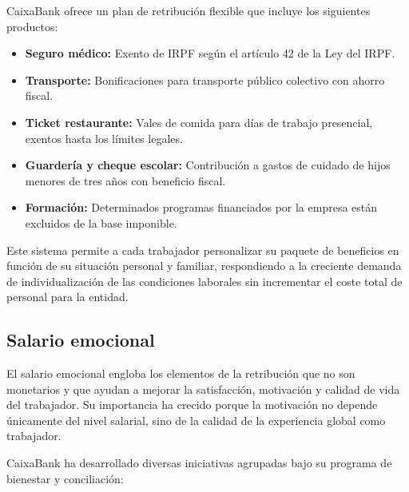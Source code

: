 CaixaBank ofrece un plan de retribución flexible que incluye los siguientes productos:

\begin{itemize}
    \item \textbf{Seguro médico:} Exento de IRPF según el artículo 42 de la Ley del IRPF\@.
    \item \textbf{Transporte:} Bonificaciones para transporte público colectivo con ahorro fiscal.
    \item \textbf{Ticket restaurante:} Vales de comida para días de trabajo presencial, exentos hasta los límites legales.
    \item \textbf{Guardería y cheque escolar:} Contribución a gastos de cuidado de hijos menores de tres años con beneficio fiscal.
    \item \textbf{Formación:} Determinados programas financiados por la empresa están excluidos de la base imponible.
\end{itemize}

Este sistema permite a cada trabajador personalizar su paquete de beneficios en función de su situación personal y familiar, respondiendo a la creciente demanda de individualización de las condiciones laborales sin incrementar el coste total de personal para la entidad.

\subsection{Salario emocional}

El salario emocional engloba los elementos de la retribución que no son monetarios y que ayudan a mejorar la satisfacción, motivación y calidad de vida del trabajador. Su importancia ha crecido porque la motivación no depende únicamente del nivel salarial, sino de la calidad de la experiencia global como trabajador.

CaixaBank ha desarrollado diversas iniciativas agrupadas bajo su programa de bienestar y conciliación:

